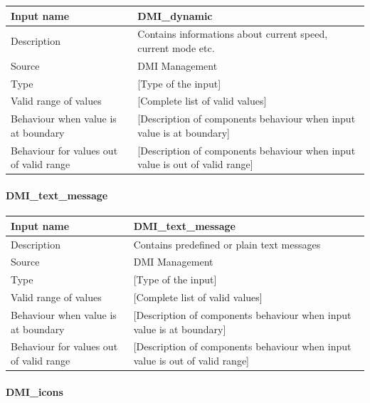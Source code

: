 \begin{longtable}{p{}p{}}
\toprule
Input name				& DMI\_dynamic \\
\midrule
Description				& Contains informations about current speed, current mode etc. \\
\midrule
Source					& DMI Management \\ 
\midrule
Type					& [Type of the input] \\
\midrule
Valid range of values	& [Complete list of valid values] \\
\midrule
Behaviour when value is at boundary	& [Description of components behaviour when input value is at boundary] \\
\midrule
Behaviour for values out of valid range	& [Description of components behaviour when input value is out of valid range] \\
\bottomrule
\end{longtable}

\paragraph{DMI\_text\_message}

\begin{longtable}{p{}p{}}
\toprule
Input name				& DMI\_text\_message \\
\midrule
Description				& Contains predefined or plain text messages \\
\midrule
Source					& DMI Management \\ 
\midrule
Type					& [Type of the input] \\
\midrule
Valid range of values	& [Complete list of valid values] \\
\midrule
Behaviour when value is at boundary	& [Description of components behaviour when input value is at boundary] \\
\midrule
Behaviour for values out of valid range	& [Description of components behaviour when input value is out of valid range] \\
\bottomrule
\end{longtable}

\paragraph{DMI\_icons}

